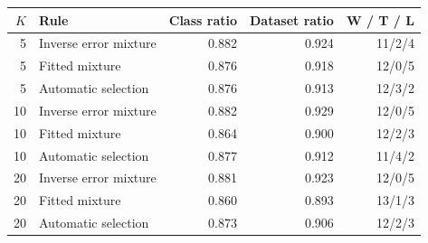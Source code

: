 \begin{tabular}{rlrrr}
\toprule
$K$ & Rule & Class ratio & Dataset ratio & W / T / L \\
\midrule
5 & Inverse error mixture & 0.882 & 0.924 & 11/2/4 \\
5 & Fitted mixture & 0.876 & 0.918 & 12/0/5 \\
5 & Automatic selection & 0.876 & 0.913 & 12/3/2 \\
10 & Inverse error mixture & 0.882 & 0.929 & 12/0/5 \\
10 & Fitted mixture & 0.864 & 0.900 & 12/2/3 \\
10 & Automatic selection & 0.877 & 0.912 & 11/4/2 \\
20 & Inverse error mixture & 0.881 & 0.923 & 12/0/5 \\
20 & Fitted mixture & 0.860 & 0.893 & 13/1/3 \\
20 & Automatic selection & 0.873 & 0.906 & 12/2/3 \\
\bottomrule
\end{tabular}
